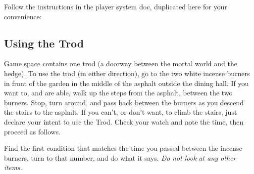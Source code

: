 \documentclass[green]{gl2018}
\begin{document}
\name{\gTrod{}}
\newcommand{\areastart}[1]{ \begin{huge}{\bf \#{#1}} \end{huge} \\}
\newenvironment{sect}[1]{\begin{minipage}{\textwidth}\areastart{#1}\\}{\end{minipage}\vspace{3in}}

Follow the instructions in the player system doc, duplicated here for your convenience:
\begin{addmargin}[0.5in]{0em}

\subsection*{Using the Trod}

Game space contains one trod (a doorway between the mortal world and the hedge). To use the trod (in either direction), go to the two white incense burners in front of the garden in the middle of the asphalt outside the dining hall. If you want to, and are able, walk up the steps from the asphalt, between the two burners. Stop, turn around, and pass back between the burners as you descend the stairs to the asphalt. If you can’t, or don’t want, to climb the stairs, just declare your intent to use the Trod. Check your watch and note the time, then proceed as follows.
\end{addmargin}
Find the first condition that matches the time you passed between the incense burners, turn to that number, and do what it says. {\em Do not look at any other items.}
\end{document}
